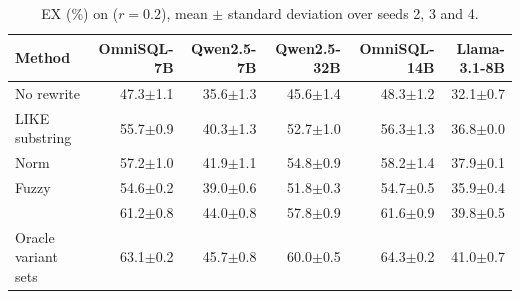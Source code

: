\begin{table}[t]
\centering
\caption{EX (\%) on \bench{} ($r=0.2$), mean $\pm$ standard deviation over seeds 2, 3 and 4.}
\label{tab:seeds}
\small
\begin{tabular}{lrrrrr}
\toprule
Method & OmniSQL-7B & Qwen2.5-7B & Qwen2.5-32B & OmniSQL-14B & Llama-3.1-8B\\
\midrule
No rewrite & 47.3$\pm$1.1 & 35.6$\pm$1.3 & 45.6$\pm$1.4 & 48.3$\pm$1.2 & 32.1$\pm$0.7 \\
LIKE substring & 55.7$\pm$0.9 & 40.3$\pm$1.3 & 52.7$\pm$1.0 & 56.3$\pm$1.3 & 36.8$\pm$0.0 \\
Norm & 57.2$\pm$1.0 & 41.9$\pm$1.1 & 54.8$\pm$0.9 & 58.2$\pm$1.4 & 37.9$\pm$0.1 \\
Fuzzy & 54.6$\pm$0.2 & 39.0$\pm$0.6 & 51.8$\pm$0.3 & 54.7$\pm$0.5 & 35.9$\pm$0.4 \\
\midrule
\sys{} & 61.2$\pm$0.8 & 44.0$\pm$0.8 & 57.8$\pm$0.9 & 61.6$\pm$0.9 & 39.8$\pm$0.5 \\
\midrule
Oracle variant sets & 63.1$\pm$0.2 & 45.7$\pm$0.8 & 60.0$\pm$0.5 & 64.3$\pm$0.2 & 41.0$\pm$0.7 \\
\bottomrule
\end{tabular}
\end{table}
